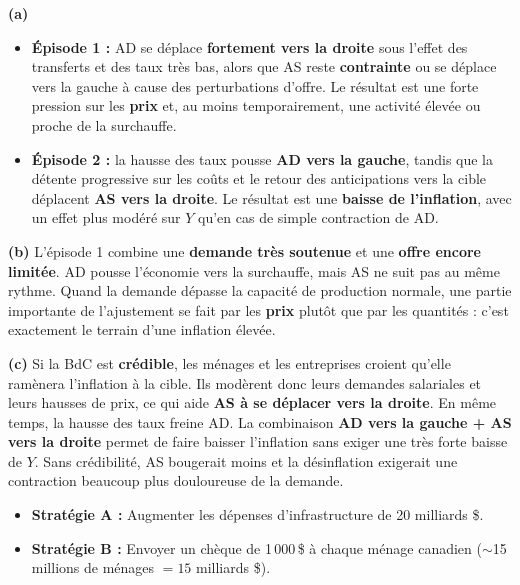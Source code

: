 \begin{reponse}
\textbf{(a)}
\begin{itemize}
   \item \textbf{Épisode 1 :} AD se déplace \textbf{fortement vers la droite} sous l'effet des transferts et des taux très bas, alors que AS reste \textbf{contrainte} ou se déplace vers la gauche à cause des perturbations d'offre. Le résultat est une forte pression sur les \textbf{prix} et, au moins temporairement, une activité élevée ou proche de la surchauffe.
   \item \textbf{Épisode 2 :} la hausse des taux pousse \textbf{AD vers la gauche}, tandis que la détente progressive sur les coûts et le retour des anticipations vers la cible déplacent \textbf{AS vers la droite}. Le résultat est une \textbf{baisse de l'inflation}, avec un effet plus modéré sur $Y$ qu'en cas de simple contraction de AD.
\end{itemize}

\textbf{(b)} L'épisode 1 combine une \textbf{demande très soutenue} et une \textbf{offre encore limitée}. AD pousse l'économie vers la surchauffe, mais AS ne suit pas au même rythme. Quand la demande dépasse la capacité de production normale, une partie importante de l'ajustement se fait par les \textbf{prix} plutôt que par les quantités : c'est exactement le terrain d'une inflation élevée.

\textbf{(c)} Si la BdC est \textbf{crédible}, les ménages et les entreprises croient qu'elle ramènera l'inflation à la cible. Ils modèrent donc leurs demandes salariales et leurs hausses de prix, ce qui aide \textbf{AS à se déplacer vers la droite}. En même temps, la hausse des taux freine AD. La combinaison \textbf{AD vers la gauche + AS vers la droite} permet de faire baisser l'inflation sans exiger une très forte baisse de $Y$. Sans crédibilité, AS bougerait moins et la désinflation exigerait une contraction beaucoup plus douloureuse de la demande.
\end{reponse}


\begin{itemize}
   \item \textbf{Stratégie A :} Augmenter les dépenses d'infrastructure de 20 milliards \$.
   \item \textbf{Stratégie B :} Envoyer un chèque de 1\,000\,\$ à chaque ménage canadien ($\sim$15 millions de ménages $= 15$ milliards \$).
\end{itemize}

